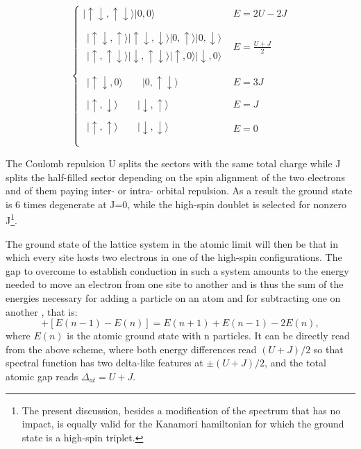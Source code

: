 \documentclass[12pt,twoside]{article}
\def\be{\begin{equation}}
\def\ee{\end{equation}}
\def\spinup{\uparrow}
\def\spindown{\downarrow}
\def\D{\Delta}
\def\up{\spinup}
\def\down{\spindown}
\begin{document}
\be\label{eq:spectrum}
\left\{
\begin{array}{cc}
|\up\down,\up\down\rangle |0,0\rangle & E=2U-2J\\
&\\
\begin{array}{c}
 |\up\down,\up\rangle |\up\down,\down\rangle |0,\up\rangle |0,\down\rangle \\ 
|\up,\up\down\rangle |\down,\up\down\rangle |\up,0\rangle |\down,0\rangle 
\end{array}
& E=\frac{U+J}{2}\\
&\\
\begin{array}{c}
|\up\down,0\rangle \qquad |0,\up\down\rangle
\end{array}
& E=3J\\
\begin{array}{c}
|\up,\down\rangle \qquad |\down,\up\rangle  
\end{array}
& E=J\\
\begin{array}{c}
|\up,\up\rangle  \qquad |\down,\down\rangle \\
\end{array}
& E=0\\
\end{array}
\right.
\ee

The Coulomb repulsion U splits the sectors with the same total charge while J splits the half-filled sector depending on the spin alignment of the two electrons and of them paying inter- or intra- orbital repulsion. As a result the ground state is 6 times degenerate at J=0, while the high-spin doublet is selected for nonzero J\footnote{The present discussion, besides a modification of the spectrum that has no impact, is equally valid for the Kanamori hamiltonian for which the ground state is a high-spin triplet.}.

The ground state of the lattice system in the atomic limit will then be that in which every site hosts two electrons in one of the high-spin configurations. 
The gap to overcome to establish conduction in such a system amounts to the energy needed to move an electron from one site to another
and is thus the sum of the energies necessary for adding a particle on an atom and for subtracting one on another , that is: 
\be
[E(n+1)-E(n)]+[E(n-1)-E(n)]= E(n+1)+E(n-1)-2E(n),
\ee
where $E(n)$ is the atomic ground state with n particles. It can be directly read from the above scheme, where both energy differences read $(U+J)/2$ so that spectral function has two delta-like features at $\pm(U+J)/2$, and the total atomic gap reads $\D_{at}=U+J$.
\end{document}
